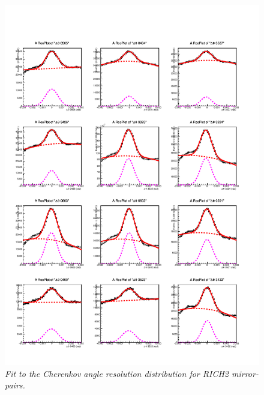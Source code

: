 \begin{figure}[!h]
	\vspace*{-0.cm}
	\begin{center}
		\includegraphics[width=1.\textwidth]{rich2_p7.pdf}
		\vspace*{-1.5cm}
	\end{center}
	\caption{\textit{Fit to the Cherenkov angle resolution distribution for RICH2 mirror-pairs.}}
	\label{fig:rich2p7}
\end{figure}
\clearpage
